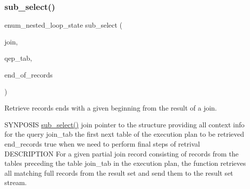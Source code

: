 \subsubsection{\texorpdfstring{sub\+\_\+select()}{sub\_select()}}
{\footnotesize\ttfamily enum\+\_\+nested\+\_\+loop\+\_\+state sub\+\_\+select (\begin{DoxyParamCaption}\item[{\mbox{\hyperlink{classJOIN}{J\+O\+IN}} $\ast$}]{join,  }\item[{\mbox{\hyperlink{classQEP__TAB}{Q\+E\+P\+\_\+\+T\+AB}} $\ast$const}]{qep\+\_\+tab,  }\item[{bool}]{end\+\_\+of\+\_\+records }\end{DoxyParamCaption})}

Retrieve records ends with a given beginning from the result of a join.

S\+Y\+N\+P\+O\+S\+IS \mbox{\hyperlink{group__Query__Executor_ga09a751162b6ad6ce37cc4db2c77cc158}{sub\+\_\+select()}} join pointer to the structure providing all context info for the query join\+\_\+tab the first next table of the execution plan to be retrieved end\+\_\+records true when we need to perform final steps of retrival ~\newline
 D\+E\+S\+C\+R\+I\+P\+T\+I\+ON For a given partial join record consisting of records from the tables preceding the table join\+\_\+tab in the execution plan, the function retrieves all matching full records from the result set and send them to the result set stream.

